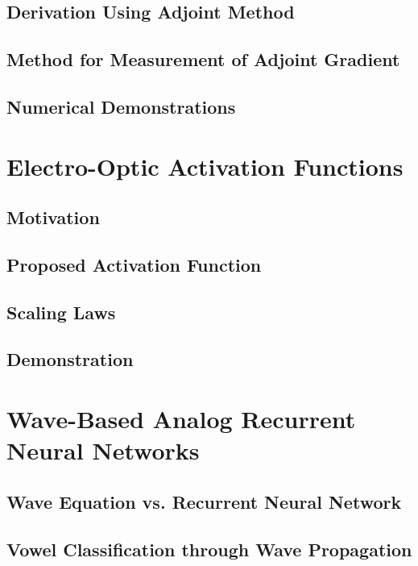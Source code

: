 \subsection{Derivation Using Adjoint Method}

\subsection{Method for Measurement of Adjoint Gradient}

\subsection{Numerical Demonstrations}

\section{Electro-Optic Activation Functions}

\subsection{Motivation}

\subsection{Proposed Activation Function}

\subsection{Scaling Laws}

\subsection{Demonstration}

\section{Wave-Based Analog Recurrent Neural Networks}

\subsection{Wave Equation vs. Recurrent Neural Network}

\subsection{Vowel Classification through Wave Propagation}
